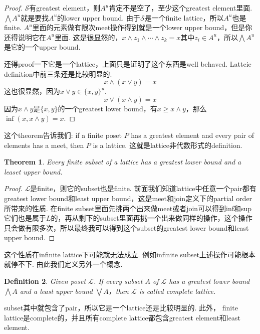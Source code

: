 \documentclass{article}
\newtheorem{theorem}{Theorem}[section]
\newtheorem{definition}[theorem]{Definition}
\newcommand\slattice{\mathcal{S}}
\newcommand\lattice{\mathcal{L}}
\begin{document}
\begin{proof}
$\slattice$有greatest element，则$A^u$肯定不是空了，至少这个greatest element里面. $\bigwedge A^u$就是要找$A^u$的lower upper bound. 由于$\slattice$是一个finite lattice，所以$A^u$也是finite. $A^u$里面的元素做有限次meet操作得到就是一个lower upper bound，但是你还得说明它在$A^u$里面. 这是很显然的，$x \wedge z_1 \wedge \cdots \wedge z_k = x$其中$z_i \in A^u$，所以$\bigwedge A^u$是它的一个upper bound.

还得proof一下它是一个lattice，上面只是证明了这个东西是well behaved. Lattcie definition中前三条还是比较明显的.
$$
x \wedge (x \vee y) = x
$$
这也很显然，因为$x \vee y \in \{x,y\}^u$.
$$
x \vee (x \wedge y) = x
$$
因为$x \wedge y$是$\{x,y\}$的一个greatest lower bound，有$x \geq x \wedge y$，那么$\inf(x,x \wedge y) = x$.
\end{proof}

这个theorem告诉我们: {\color{red} if a finite poset $P$ has a greatest element and every pair of elements has a meet,
then $P$ is a lattice}. 这就是lattice非代数形式的definition.

\begin{theorem}
\rm Every finite subset of a lattice has a greatest lower bound and a leaset upper bound.
\end{theorem}

\begin{proof}
$\lattice$是finite，则它的subset也是finite. 前面我们知道lattice中任意一个pair都有greatest lower bound和least upper bound，这是meet和join定义下的partial order所带来的性质. 在finite subset里面先挑两个出来做meet或者join可以得到inf和sup它们也是属于$L$的，再从剩下的subset里面再挑一个出来做同样的操作，这个操作只会做有限多次，所以最终我可以得到这个subset的greatest lower bound和least upper bound.
\end{proof}

{\color{red} 这个性质在infinite lattice下可能就无法成立}. 例如infinite subset上述操作可能根本就停不下. 由此我们定义另外一个概念.

\begin{definition}
\rm Given poset $\lattice$. If every subset $A$ of $\lattice$ has a greatest lower bound $\bigwedge A$ and a least upper bound $\bigvee A$，then $\lattice$ is called {\color{red} complete lattice}. 
\end{definition}

{\color{blue} subset其中就包含了pair，所以它是一个lattice还是比较明显的}. 此外，{\color{red} finite lattice是complete的，并且所有complete lattice都包含greatest element和least element}.
\end{document}
